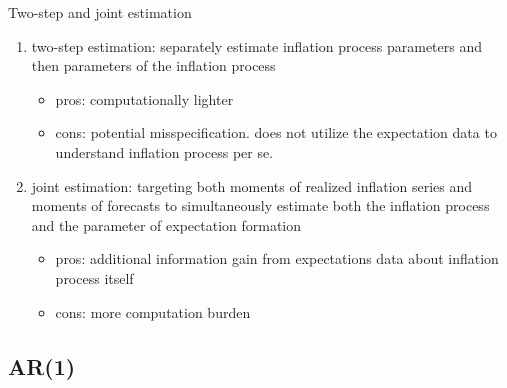 \documentclass{beamer}
\begin{document}
\begin{frame}{Two-step and joint estimation}
	\begin{enumerate}
		\item two-step estimation:  separately estimate inflation process parameters and then parameters of the inflation process
		\begin{itemize}
			\item pros: computationally lighter 
			\item cons: potential misspecification. does not utilize the expectation data to understand inflation process per se.  
		\end{itemize}
		\item joint estimation: targeting both moments of realized inflation series and moments of forecasts to simultaneously estimate both the inflation process and the parameter of expectation formation
		\begin{itemize}
			\item pros: additional information gain from expectations data about inflation process itself
			\item cons: more computation burden  
		\end{itemize}
	\end{enumerate}
\end{frame}


\subsection{AR(1)}
\end{document}

